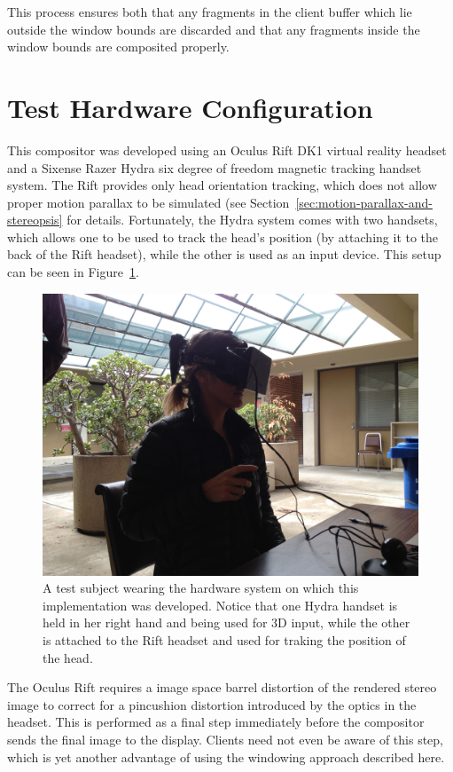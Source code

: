 This process ensures both that any fragments in the client buffer which lie outside the window bounds are discarded and that any fragments inside the window bounds are composited properly.


\section{Test Hardware Configuration}

This compositor was developed using an Oculus Rift DK1 virtual reality headset and a Sixense Razer Hydra six degree of freedom magnetic tracking handset system. The Rift provides only head orientation tracking, which does not allow proper motion parallax to be simulated (see Section~\ref{sec:motion-parallax-and-stereopsis} for details. Fortunately, the Hydra system comes with two handsets, which allows one to be used to track the head's position (by attaching it to the back of the Rift headset), while the other is used as an input device. This setup can be seen in Figure~\ref{fig:hardware-setup}.

\begin{figure}[ht!]
\centering
\includegraphics[width=1.0\textwidth]{images/hardware-setup.jpg}
\caption{A test subject wearing the hardware system on which this implementation was developed. Notice that one Hydra handset is held in her right hand and being used for 3D input, while the other is attached to the Rift headset and used for traking the position of the head.}
\label{fig:hardware-setup}
\end{figure}

The Oculus Rift requires a image space barrel distortion of the rendered stereo image to correct for a pincushion distortion introduced by the optics in the headset. This is performed as a final step immediately before the compositor sends the final image to the display. Clients need not even be aware of this step, which is yet another advantage of using the windowing approach described here.











